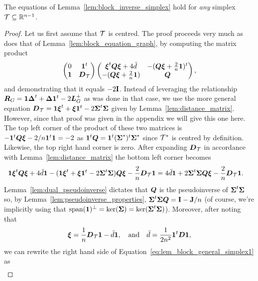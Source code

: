 \begin{theorem}
	\label{thm:block_general_simplex}
	The equations of Lemma~\ref{lem:block_inverse_simplex} hold for \emph{any} simplex $\mathcal{T}\subseteq\mathbb{R}^{n-1}$. 
\end{theorem}
\begin{proof}
	Let us first assume that $\mathcal{T}$ is centred. 
	The proof proceeds very much as  does  that of Lemma~\ref{lem:block_equation_graph}, by computing the matrix product  
	\[\begin{pmatrix}
	0 & \vb{1}^t \\
	\vb{1} & \vb*{D}_{\mathcal{T}}
	\end{pmatrix} \begin{pmatrix}
	\vb*{\xi}^t\vb*{Q}\vb*{\xi} + 4\bar{d}  &  -(\vb*{Q}\vb*{\xi}  + \frac{2}{n}\vb{1})^t  \\
	-(\vb*{Q}\vb*{\xi}  + \frac{2}{n}\vb{1}) &  \vb*{Q}
	\end{pmatrix},\] and demonstrating that it equals $-2\vb{I}$. Instead of leveraging  the relationship $\vb*{R}_G=\vb{1}\vb*{\Delta}^t+\vb*{\Delta}\vb{1}^t - 2\vb*{L}_G^+$ as was done  in that case, we use the more general equation $\vb*{D}_{\mathcal{T}} = \vb{1}\vb*{\xi}^t+\vb*{\xi}\vb{1}^t - 2\boldsymbol{\Sigma}^t\boldsymbol{\Sigma}$ given by Lemma~\ref{lem:distance_matrix}. However, since that proof  was given  in the appendix we will give this one here.  The top left corner of  the product of these two matrices is $-\vb{1}^t\vb*{Q}\vb*{\xi}-2/n \vb{1}^t\vb{1} = -2$ as $\vb{1}^t\vb*{Q} = \vb{1}^t(\boldsymbol{\Sigma}^*)^t\boldsymbol{\Sigma}^*$ since $\mathcal{T}^*$ is centred by definition. Likewise,  the top right  hand corner is zero.  After expanding $\vb*{D}_{\mathcal{T}}$  in accordance with Lemma~\ref{lem:distance_matrix} the bottom left  corner becomes 
	\begin{align}
	&\vb{1}\vb*{\xi}^t\vb*{Q}\vb*{\xi}+4\bar{d}\vb{1} - (\vb{1}\vb*{\xi}^t+\vb*{\xi}\vb{1}^t - 2\boldsymbol{\Sigma}^t\boldsymbol{\Sigma})\vb*{Q}\vb*{\xi} -\frac{2}{n}\vb*{D}_{\mathcal{T}}\vb{1} = 4\bar{d}\vb{1} + 2\boldsymbol{\Sigma}^t\boldsymbol{\Sigma}\vb*{Q}\vb*{\xi}  -\frac{2}{n}\vb*{D}_{\mathcal{T}}\vb{1}. \label{eq:lem_block_general_simplex1}
	\end{align}
	Lemma~\ref{lem:dual_pseudoinverse} dictates that $\vb*{Q}$ is the pseudoinverse of $\boldsymbol{\Sigma}^t\boldsymbol{\Sigma}$ so, by Lemma~\ref{lem:pseudoinverse_properties}, $\boldsymbol{\Sigma}^t\boldsymbol{\Sigma}\vb*{Q}=\vb{I}-\vb{J}/n$ (of course, we're implicitly using that $\textnormal{span}(\vb{1})^\perp = \ker(\boldsymbol{\Sigma})=\ker(\boldsymbol{\Sigma}^t\boldsymbol{\Sigma})$). 
	Moreover, after noting that 
	\begin{equation*}
	\vb*{\xi} = \frac{1}{n}\vb*{D}_{\mathcal{T}}\vb{1} -\bar{d}\vb{1},\quad \text{and}\quad  \bar{d} = \frac{1}{2n^2}\vb{1}^t\vb*{D}\vb{1},
	\end{equation*}
	we can  rewrite the right  hand side of Equation~\eqref{eq:lem_block_general_simplex1} as 
	\begin{align*}

\end{align*}
\end{proof}
